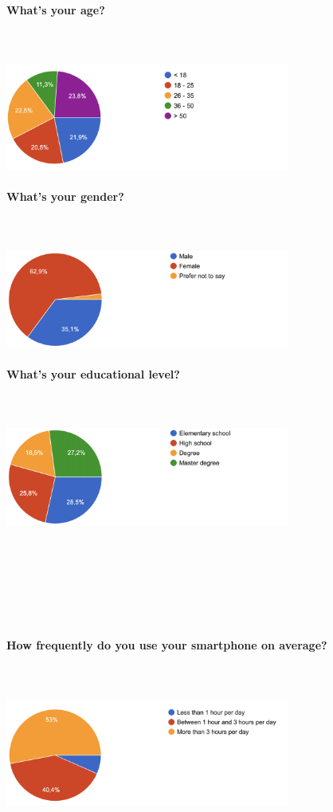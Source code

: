 \documentclass[12pt, a4paper]{article}
\begin{document}
\paragraph{What's your age?}\mbox{}\\\\
\includegraphics[width=0.7\textwidth]{Images/age.png}

\paragraph{What's your gender?}\mbox{}\\\\
\includegraphics[width=0.7\textwidth]{Images/gender.png}

\paragraph{What's your educational level?}\mbox{}\\\\
\includegraphics[width=0.7\textwidth]{Images/education.png}\\\\\\\\\\\\\\


\paragraph{How frequently do you use your smartphone on average?}\mbox{}\\\\
\includegraphics[width=0.7\textwidth]{Images/timeAtPhone.png}
\end{document}
